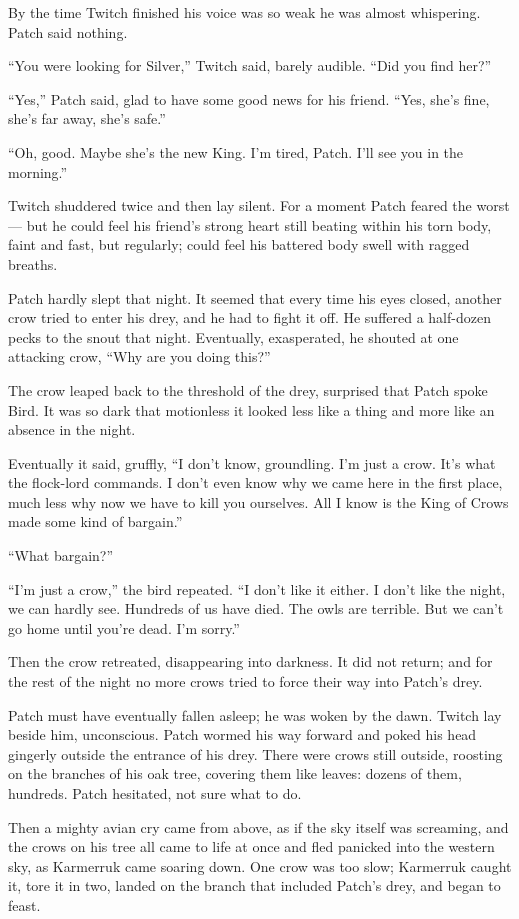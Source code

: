 \documentclass[ebook,oneside,openany,17pt]{memoir}
\begin{document}
By the time Twitch finished his voice was so weak he was almost
whispering. Patch said nothing.

“You were looking for Silver,” Twitch said, barely audible. “Did you
find her?”

“Yes,” Patch said, glad to have some good news for his friend. “Yes,
she’s fine, she’s far away, she’s safe.”

“Oh, good. Maybe she’s the new King. I’m tired, Patch. I’ll see you in
the morning.”

Twitch shuddered twice and then lay silent. For a moment Patch feared
the worst — but he could feel his friend’s strong heart still beating
within his torn body, faint and fast, but regularly; could feel his
battered body swell with ragged breaths.

Patch hardly slept that night. It seemed that every time his eyes
closed, another crow tried to enter his drey, and he had to fight it
off. He suffered a half-dozen pecks to the snout that
night. Eventually, exasperated, he shouted at one attacking crow, “Why
are you doing this?”

The crow leaped back to the threshold of the drey, surprised that
Patch spoke Bird. It was so dark that motionless it looked less like a
thing and more like an absence in the night.

Eventually it said, gruffly, “I don’t know, groundling. I’m just a
crow. It’s what the flock-lord commands. I don’t even know why we came
here in the first place, much less why now we have to kill you
ourselves. All I know is the King of Crows made some kind of bargain.”

“What bargain?”

“I’m just a crow,” the bird repeated. “I don’t like it either. I don’t
like the night, we can hardly see. Hundreds of us have died. The owls
are terrible. But we can’t go home until you’re dead. I’m sorry.”

Then the crow retreated, disappearing into darkness. It did not
return; and for the rest of the night no more crows tried to force
their way into Patch’s drey.

Patch must have eventually fallen asleep; he was woken by the
dawn. Twitch lay beside him, unconscious. Patch wormed his way forward
and poked his head gingerly outside the entrance of his drey. There
were crows still outside, roosting on the branches of his oak tree,
covering them like leaves: dozens of them, hundreds. Patch hesitated,
not sure what to do.

Then a mighty avian cry came from above, as if the sky itself was
screaming, and the crows on his tree all came to life at once and fled
panicked into the western sky, as Karmerruk came soaring down. One
crow was too slow; Karmerruk caught it, tore it in two, landed on the
branch that included Patch’s drey, and began to feast.
\end{document}
